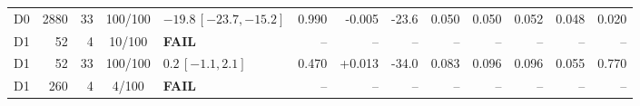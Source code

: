\documentclass[10pt,a4paper]{article}
\begin{document}
\begin{longtable}{crrcp{33mm}rrrrrrrr}
D0 & 2880 & 33 & 100/100 & \(-19.8\,[-23.7,-15.2]\) & 0.990 & -0.005 & -23.6 & 0.050 & 0.050 & 0.052 & 0.048 & 0.020\\
D1 & 52 & 4 & 10/100 & \textbf{FAIL} & -- & -- & -- & -- & -- & -- & -- & --\\
D1 & 52 & 33 & 100/100 & \(0.2\,[-1.1,2.1]\) & 0.470 & +0.013 & -34.0 & 0.083 & 0.096 & 0.096 & 0.055 & 0.770\\
D1 & 260 & 4 & 4/100 & \textbf{FAIL} & -- & -- & -- & -- & -- & -- & -- & --\\

\end{longtable}
\end{document}
